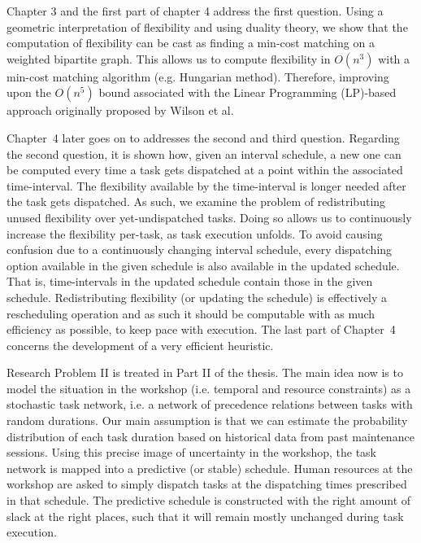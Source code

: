Chapter 3 and the first part of chapter 4 address the first question.
Using a geometric interpretation of flexibility and using duality theory,
we show that the computation of flexibility can be cast as finding a min-cost matching on a weighted bipartite graph.
This allows us to compute flexibility in $O(n^3)$ with a min-cost matching algorithm (e.g. Hungarian method).
Therefore, improving upon the $O(n^5)$ bound associated with the Linear Programming (LP)-based approach originally proposed by Wilson et al.

Chapter~4 later goes on to addresses the second and third question.
Regarding the second question, it is shown how, given an interval schedule,
a new one can be computed every time a task gets dispatched at a point within the associated time-interval.
The flexibility available by the time-interval is longer needed after the task gets dispatched.
As such, we examine the problem of redistributing unused flexibility over yet-undispatched tasks.
Doing so allows us to continuously increase the flexibility per-task, as task execution unfolds.
To avoid causing confusion due to a continuously changing interval schedule,
every dispatching option available in the given schedule is also available in the updated schedule.
That is, time-intervals in the updated schedule contain those in the given schedule.
Redistributing flexibility (or updating the schedule) is effectively a rescheduling operation
and as such it should be computable with as much efficiency as possible, to keep pace with execution.
The last part of Chapter~4 concerns the development of a very efficient heuristic.


Research Problem II is treated in Part II of the thesis.
The main idea now is to model the situation in the workshop (i.e. temporal and resource constraints) as a stochastic task network,
i.e. a network of precedence relations between tasks with random durations.
Our main assumption is that we can estimate the probability distribution of each task duration based on historical data from past maintenance sessions.
Using this precise image of uncertainty in the workshop,
the task network is mapped into a predictive (or stable) schedule.
Human resources at the workshop are asked to simply dispatch tasks at the dispatching times prescribed in that schedule.
The predictive schedule is constructed with the right amount of slack at the right places,
such that it will remain mostly unchanged during task execution.

